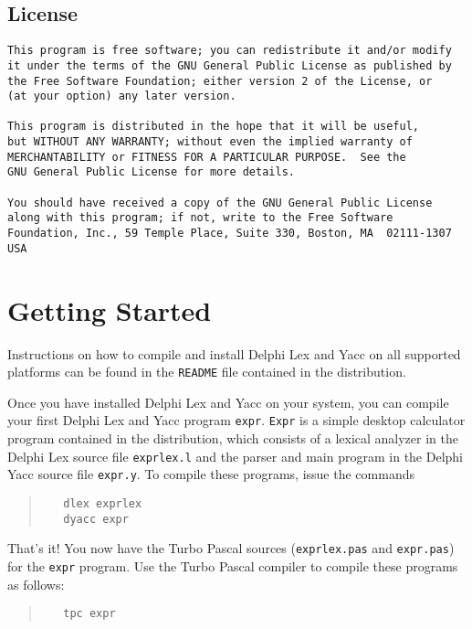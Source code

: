 \documentclass{article}
\begin{document}
\subsection{License}
\begin{verbatim}
This program is free software; you can redistribute it and/or modify
it under the terms of the GNU General Public License as published by
the Free Software Foundation; either version 2 of the License, or
(at your option) any later version.

This program is distributed in the hope that it will be useful,
but WITHOUT ANY WARRANTY; without even the implied warranty of
MERCHANTABILITY or FITNESS FOR A PARTICULAR PURPOSE.  See the
GNU General Public License for more details.

You should have received a copy of the GNU General Public License
along with this program; if not, write to the Free Software
Foundation, Inc., 59 Temple Place, Suite 330, Boston, MA  02111-1307  USA
\end{verbatim}

\newpage

\section{Getting Started}

Instructions on how to compile and install Delphi Lex and Yacc on all supported
platforms can be found in the \verb"README" file contained in the
distribution.

Once you have installed Delphi Lex and Yacc on your system, you can compile your
first Delphi Lex and Yacc program \verb"expr". \verb"Expr" is a simple desktop
calculator program contained in the distribution, which consists of a lexical
analyzer in the Delphi Lex source file \verb"exprlex.l" and the parser and main
program in the Delphi Yacc source file \verb"expr.y". To compile these programs,
issue the commands
\begin{quote}\begin{verbatim}
   dlex exprlex
   dyacc expr
\end{verbatim}\end{quote}
That's it! You now have the Turbo Pascal sources (\verb"exprlex.pas" and
\verb"expr.pas") for the \verb"expr" program. Use the Turbo Pascal
compiler to compile these programs as follows:
\begin{quote}\begin{verbatim}
   tpc expr
\end{verbatim}\end{quote}
\end{document}
